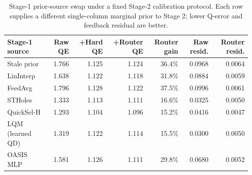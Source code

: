 \begin{table}[t]
  \centering
  \small
  \caption{Stage-1 prior-source swap under a fixed Stage-2 calibration protocol. Each row supplies a different single-column marginal prior to Stage 2; lower Q-error and feedback residual are better.}
  \label{tab:stage1_estimator_swap}
  \setlength{\tabcolsep}{4pt}
  \begin{tabular}{lrrrrrr}
    \toprule
    Stage-1 source & Raw QE & +Hard QE & +Router QE & Router gain & Raw resid. & Router resid. \\
    \midrule
    Stale prior & 1.766 & 1.125 & 1.124 & 36.4\% & 0.0968 & 0.0064 \\
    LinInterp & 1.638 & 1.122 & 1.118 & 31.8\% & 0.0884 & 0.0059 \\
    FeedAvg & 1.796 & 1.128 & 1.122 & 37.5\% & 0.0996 & 0.0061 \\
    STHoles & 1.333 & 1.113 & 1.111 & 16.6\% & 0.0325 & 0.0050 \\
    QuickSel-H & 1.293 & 1.104 & 1.096 & 15.2\% & 0.0416 & 0.0047 \\
    LQM (learned QD) & 1.319 & 1.122 & 1.114 & 15.5\% & 0.0300 & 0.0050 \\
    OASIS MLP & 1.581 & 1.126 & 1.111 & 29.8\% & 0.0680 & 0.0052 \\
    \bottomrule
  \end{tabular}
\end{table}
